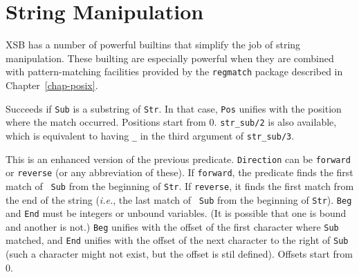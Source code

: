 \section{String Manipulation}
\label{sec-strings}

        XSB has a number of powerful builtins that simplify the job of string
manipulation. These builting are especially powerful when they are combined
with pattern-matching facilities provided by the {\tt regmatch} package
described in Chapter~\ref{chap-posix}.

\begin{description}

Succeeds if {\tt Sub} is a substring of {\tt Str}. In that case, {\tt Pos}
unifies with the position where the match occurred. Positions start
from 0. {\tt str\_sub/2} is also available, which is equivalent
to having {\tt \_} in the third argument of {\tt str\_sub/3}.


This is an enhanced version of the previous predicate.
{\tt Direction} can be {\tt forward} or {\tt reverse} (or any abbreviation
of these). If {\tt forward}, the predicate finds the first match of {\tt
  Sub} from the beginning of {\tt Str}. If {\tt reverse}, it finds the
first match from the end of the string ({\it i.e.}, the last match of {\tt
  Sub} from the beginning of {\tt Str}). {\tt Beg} and {\tt End} must be
integers or unbound variables. (It is possible that one is bound and
another is not.)
{\tt Beg} unifies with the offset of the first character where {\tt Sub}
matched, and {\tt End} unifies with the offset of the next character to the
right of {\tt Sub} (such a character might not exist, but the offset is
stil defined). Offsets start from 0.


\end{description}
